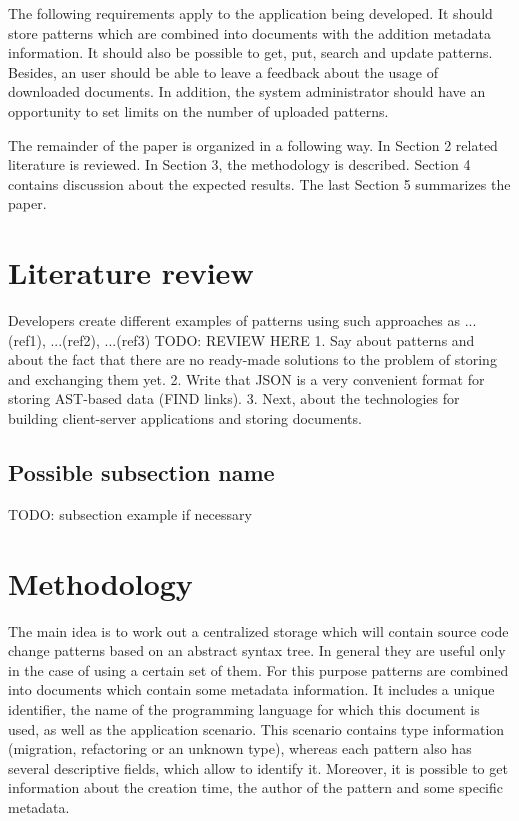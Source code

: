 \documentclass[letterpaper, 10 pt, conference]{ieeeconf}  %
\begin{document}
The following requirements apply to the application being developed. It
should store patterns which are combined into documents with the addition
metadata information. It should also be possible to get, put, search and
update patterns. Besides, an user should be able to leave a feedback about
the usage of downloaded documents. In addition, the system administrator
should have an opportunity to set limits on the number of uploaded
patterns.

The remainder of the paper is organized in a following way. In
Section 2 related literature is reviewed. In Section 3, the
methodology is described. Section 4 contains discussion about the expected
results. The last Section 5 summarizes the paper.

\section{Literature review}

Developers create different examples of patterns using such approaches as
...(ref1), ...(ref2), ...(ref3)
TODO: REVIEW HERE
1. Say about patterns and about the fact that there are no ready-made solutions to the problem of storing and exchanging them yet.
2. Write that JSON is a very convenient format for storing AST-based data (FIND links).
3. Next, about the technologies for building client-server applications and storing documents.

\subsection{Possible subsection name}

TODO: subsection example if necessary

\section{Methodology}

The main idea is to work out a centralized storage which will contain
source code change patterns based on an abstract syntax tree. In
general they are useful only in the case of using a certain set of
them. For this purpose patterns are combined into documents which
contain some metadata information. It includes a unique identifier,
the name of the programming language for which this document is used,
as well as the application scenario. This scenario contains type
information (migration, refactoring or an unknown type), whereas each
pattern also has several descriptive fields, which allow to identify
it. Moreover, it is possible to get information about the creation
time, the author of the pattern and some specific metadata.
\end{document}
